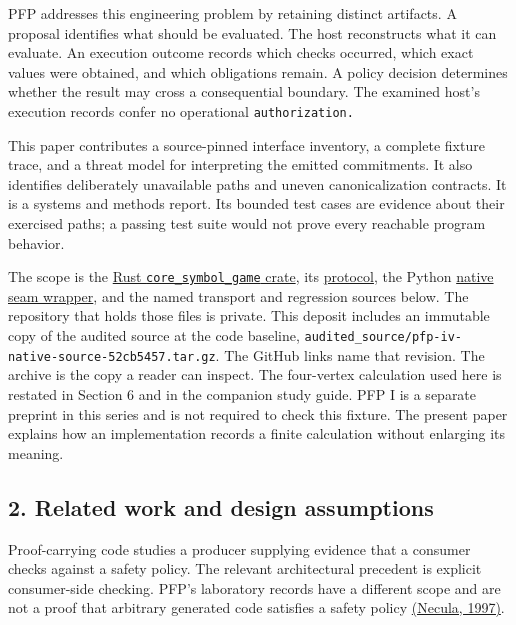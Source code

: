 \documentclass[
  11pt,
]{article}
\begin{document}
PFP addresses this engineering problem by retaining distinct artifacts.
A proposal identifies what should be evaluated. The host reconstructs
what it can evaluate. An execution outcome records which checks
occurred, which exact values were obtained, and which obligations
remain. A policy decision determines whether the result may cross a
consequential boundary. The examined host's execution records confer no
operational \nolinkurl{authorization.}

This paper contributes a source-pinned interface inventory, a complete
fixture trace, and a threat model for interpreting the emitted
commitments. It also identifies deliberately unavailable paths and
uneven canonicalization contracts. It is a systems and methods report.
Its bounded test cases are evidence about their exercised paths; a
passing test suite would not prove every reachable program behavior.

The scope is the
\href{https://github.com/dbccpage/the_symbol_game/tree/52cb5457f6c485ba548cfd292f6012a941ed22cf/engine/crates_rs/core_symbol_game}{Rust
\nolinkurl{core_symbol_game} crate}, its
\href{https://github.com/dbccpage/the_symbol_game/blob/52cb5457f6c485ba548cfd292f6012a941ed22cf/engine/crates_rs/core_symbol_game/src/protocol.rs}{protocol},
the Python
\href{https://github.com/dbccpage/the_symbol_game/blob/52cb5457f6c485ba548cfd292f6012a941ed22cf/pfp/ffi.py}{native
seam wrapper}, and the named transport and regression sources below. The
repository that holds those files is private. This deposit includes an
immutable copy of the audited source at the code baseline,
\nolinkurl{audited_source/pfp-iv-native-source-52cb5457.tar.gz}. The
GitHub links name that revision. The archive is the copy a reader can
inspect. The four-vertex calculation used here is restated in Section 6
and in the companion study guide. PFP I is a separate preprint in this
series and is not required to check this fixture. The present paper
explains how an implementation records a finite calculation without
enlarging its meaning.

\subsection{2. Related work and design
assumptions}\label{related-work-and-design-assumptions}

Proof-carrying code studies a producer supplying evidence that a
consumer checks against a safety policy. The relevant architectural
precedent is explicit consumer-side checking. PFP's laboratory records
have a different scope and are not a proof that arbitrary generated code
satisfies a safety policy
\href{https://doi.org/10.1145/263699.263712}{(Necula, 1997)}.
\end{document}
